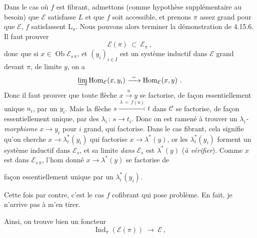 \documentclass[11pt]{article}
\newcommand{\msp}[1]{\marginpar{\footnotesize [#1]}}
\newcommand{\cE}{\mathcal{E}}
\newcommand{\cC}{\mathcal{C}}
\newcommand{\Ob}{\operatorname{Ob}}
\newcommand{\Hom}{\operatorname{Hom}}
\newcommand{\Ind}{\operatorname{Ind}}
\begin{document}
\msp{page 439}Dans le cas où $f$ est fibrant, admettons (comme hypothèse supplémentaire au besoin) que $\cE$ satisfasse $L$ et que $f$ soit accessible, et prenons $\pi$ assez grand pour que $\cE$, $f$ satisfassent $\mathrm{L}_{\pi}$. Nous pouvons alors terminer la démonstration de 4.15.6. Il faut prouver
\[
\cE(\pi) \ \subset \ \cE_{\pi} \ ,
\]
donc que si $x \in \Ob \cE_{s\,\pi}$, et $(y_i)_{i \in I}$ est un système inductif dans $\cE$ grand devant $\pi$, de limite $y$, on a
\[
\varinjlim \Hom_{\cE}(x, y_i) \xrightarrow{\ \sim\ } \Hom_{\cE}(x, y) \ .
\]
Donc il faut prouver que toute flèche $x \xrightarrow{u} y$ se factorise, de façon essentiellement unique $u_i$, par un $y_i$. Mais la flèche $s \xrightarrow{\ \lambda \, = \, f(u)\ } t$ dans $\cC$ se factorise, de façon essentiellement unique, par des $\lambda_i \, : \, s \longrightarrow t_i$. Donc on est ramené à trouver un \textit{$\lambda_i$-morphisme} $x \longrightarrow y_i$ pour $i$ grand, qui factorise. Dans le cas fibrant, cela signifie qu'on cherche $x \longrightarrow \lambda^*_i(y_i)$ qui factorise $x \longrightarrow \lambda^*(y)$, or les $\lambda^*_i(y_i)$ forment un système inductif dans $\cE_s$, et sa limite \textit{dans} $\cE_s$ est $\lambda^*(y)$ (\textit{à vérifier}). Comme $x$ est dans $\cE_{s\,\pi}$, l'hom donné $x \longrightarrow \lambda^*(y)$ se factorise de

\msp{page 440}façon essentiellement unique par un $\lambda^*_i(y_i)$.

Cette fois par contre, c'est le cas $f$ cofibrant qui pose problème. En fait, je n'arrive pas à m'en tirer.

Ainsi, on trouve bien un foncteur
\[
\Ind_{\pi}(\cE(\pi)) \ \longrightarrow \ \cE \ ,
\]
\end{document}
